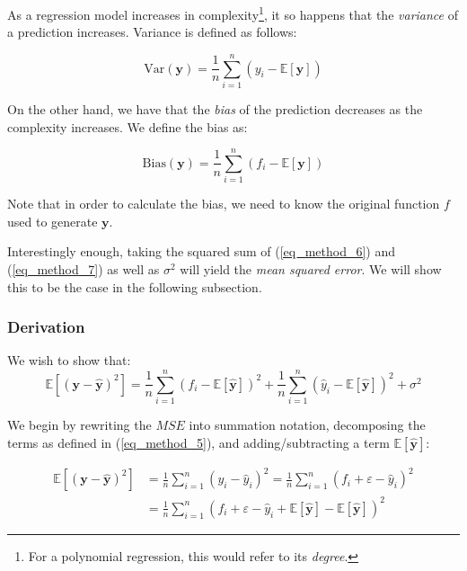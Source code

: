 \documentclass[a4paper,10pt,english]{article}
\begin{document}
As a regression model increases in complexity\footnote{For a polynomial regression, this would refer to its \textit{degree}.}, it so happens that the \textit{variance} of a prediction increases.  Variance is defined as follows:

\begin{equation}
\label{eq_method_6}
\text{Var}(\mathbf{y}) = \frac{1}{n} \sum_{i=1}^{n} (y_i - \mathbb{E}[\mathbf{y}] )
\end{equation}

On the other hand, we have that the \textit{bias} of the prediction decreases as the complexity increases.  We define the bias as:

\begin{equation}
\label{eq_method_7}
\text{Bias}(\mathbf{y}) = \frac{1}{n} \sum_{i=1}^{n} (f_i - \mathbb{E}[\mathbf{y}] )
\end{equation}

Note that in order to calculate the bias, we need to know the original function $f$ used to generate $\mathbf{y}$.

Interestingly enough, taking the squared sum of (\ref{eq_method_6}) and (\ref{eq_method_7}) as well as $\sigma^2$ will yield the \textit{mean squared error}.  We will show this to be the case in the following subsection.

\subsubsection{Derivation}

We wish to show that:
\begin{equation}
\label{eq_method_8}
\mathbb{E}\left[(\mathbf{y}-\hat{\mathbf{y}})^{2}\right]
=\frac{1}{n} \sum_{i=1}^{n}(f_{i}-\mathbb{E}[\hat{\mathbf{y}}])^{2}+\frac{1}{n} \sum_{i=1}^{n}(\hat{y}_{i}-\mathbb{E}[\hat{\mathbf{y}}])^{2}+\sigma^{2}
\end{equation}

We begin by rewriting the $MSE$ into summation notation, decomposing the terms as defined in (\ref{eq_method_5}), and adding/subtracting a term $\mathbb{E}[\hat{\mathbf{y}}]$:

\begin{align*}
\mathbb{E}\left[(\mathbf{y}-\hat{\mathbf{y}})^{2}\right] &= \frac{1}{n} \sum_{i=1}^{n} ( y_i - \hat{y}_i )^2 = \frac{1}{n} \sum_{i=1}^{n} ( f_i + \varepsilon - \hat{y}_i )^2 \\
&= \frac{1}{n} \sum_{i=1}^{n} ( f_i + \varepsilon - \hat{y}_i  + \mathbb{E}[\hat{\mathbf{y}}] - \mathbb{E}[\hat{\mathbf{y}}] )^2
\end{align*}
\end{document}
